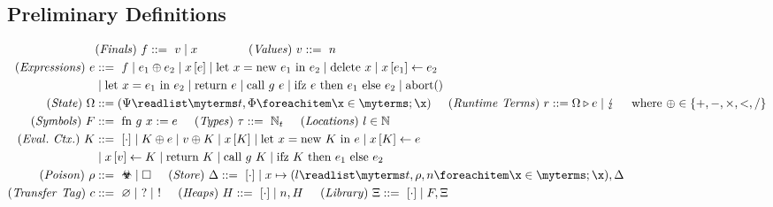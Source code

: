 \documentclass[utf8,acmsmall,review,screen,dvipsnames]{acmart}
\begin{document}
\subsection{Preliminary Definitions}\label{subsec:cs:defs}
\begin{gather*}
  \begin{aligned}
  &\mi{(Finals)}~\finalexpr\bnfdef\ \valueexpr \mid x\hspace{1.5cm}
  \mi{(Values)}~\valueexpr\bnfdef\ n\\
  \mi{(Expressions)}~\expr&\bnfdef\ \finalexpr \mid \lbinop{\expr[_{1}]}{\expr[_{2}]} \mid \lget{x}{\expr} \mid \lnew{x}{\expr[_{1}]}{\expr[_{2}]} \mid \ldelete{x} \mid \lset{x}{\expr[_{1}]}{\expr[_{2}]} \\
    & \mid \llet{x}{\expr[_{1}]}{\expr[_{2}]} \mid \lreturn{\expr} \mid \lcall{g}{\expr} \mid \lifz{\expr}{\expr[_{1}]}{\expr[_{2}]} \mid \labort \\
  \mi{(State)}~\statevar&\bnfdef \tup{\cfstate}{\sandboxtag,\memstate} \hspace{0.5cm}
  \mi{(Runtime~Terms)}~\runtimetermvar\bnfdef\rtt{\statevar}{\expr} \mid \lightning \hspace{0.5cm}
    \text{where}\ \lbinop{}{}\in\left\{+,-,\times,<,/\right\}\\
  \mi{(Symbols)}~\function&\bnfdef\ \lfunction{g}{x}{e}\hspace{0.5cm}
  \mi{(Types)}~\type\bnfdef\ \natt\hspace{0.5cm}
  \mi{(Locations)}~\loc\in\nat \\
  \mi{(Eval.~Ctx.)}~\ectx&\bnfdef\ \hole{\cdot} \mid \lbinop{\ectx}{\expr} \mid \lbinop{\valueexpr}{\ectx} \mid \lget{x}{\ectx} \mid \lnew{x}{\ectx}{\expr} \mid \lset{x}{\ectx}{\expr}\\
    & \mid \lset{x}{\valueexpr}{\ectx} \mid \lreturn{\ectx} \mid \lcall{g}{\ectx} \mid \lifz{\ectx}{\expr[_{1}]}{\expr[_{2}]} \\
  \mi{(Poison)}~\poison&\bnfdef\ \poisoned \mid \poisonless \hspace{0.5cm}
  \mi{(Store)}~\store\bnfdef\ \hole{\cdot} \mid \storeel{x}{\loc}{\sandboxtag}{\poison}{n},\store \\
  \mi{(Transfer~Tag)}~\comm&\bnfdef\ \nocomm \mid\ \ctxtocomp \mid\ \comptoctx \hspace{0.5cm}
  \mi{(Heaps)}~\heap\bnfdef\ \hole{\cdot} \mid n,\heap \hspace{0.5cm}
  \mi{(Library)}~\library\bnfdef\ \hole{\cdot} \mid \function,\library \\

\end{aligned}
\end{gather*}
\end{document}
